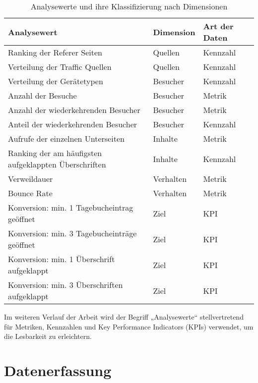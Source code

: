\begin{table}[H]
    \centering
    \begin{tabularx}{\textwidth}{l l l}
        \hline
        \textbf{Analysewert} & \textbf{Dimension} & \textbf{Art der Daten} \\
        \hline
        Ranking der Referer Seiten & Quellen & Kennzahl \\
        Verteilung der Traffic Quellen & Quellen & Kennzahl \\
        Verteilung der Gerätetypen & Besucher & Kennzahl \\
        Anzahl der Besuche & Besucher & Metrik \\
        Anzahl der wiederkehrenden Besucher & Besucher & Metrik \\
        Anteil der wiederkehrenden Besucher & Besucher & Kennzahl \\
        Aufrufe der einzelnen Unterseiten & Inhalte & Metrik \\
        Ranking der am häufigsten aufgeklappten Überschriften & Inhalte & Kennzahl \\
        Verweildauer & Verhalten & Metrik \\
        Bounce Rate & Verhalten & Metrik \\
        Konversion: min. 1 Tagebucheintrag geöffnet & Ziel & KPI \\
        Konversion: min. 3 Tagebucheinträge geöffnet & Ziel & KPI \\
        Konversion: min. 1 Überschrift aufgeklappt & Ziel & KPI \\
        Konversion: min. 3 Überschriften aufgeklappt & Ziel & KPI \\
        \hline
    \end{tabularx}
    \caption{Analysewerte und ihre Klassifizierung nach Dimensionen}
    \label{tab:analysewerte}
\end{table}

Im weiteren Verlauf der Arbeit wird der Begriff „Analysewerte“ stellvertretend für Metriken, Kennzahlen und Key Performance Indicators (KPIs) verwendet, um die Lesbarkeit zu erleichtern.

\section{Datenerfassung}

